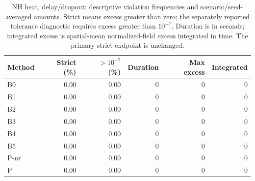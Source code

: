 \begin{table}[ht]
\centering\small
\caption{NH heat, delay/dropout: descriptive violation frequencies and scenario/seed-averaged amounts. Strict means excess greater than zero; the separately reported tolerance diagnostic requires excess greater than $10^{-7}$. Duration is in seconds; integrated excess is spatial-mean normalized-field excess integrated in time. The primary strict endpoint is unchanged.}\label{tab:new_heat_constraints_locked_delay_dropout}
\begin{tabular}{@{}lrrrrr@{}}\toprule
Method & Strict (\%) & $>10^{-7}$ (\%) & Duration & Max excess & Integrated\\\midrule
B0 & 0.00 & 0.00 & 0 & 0 & 0\\
B1 & 0.00 & 0.00 & 0 & 0 & 0\\
B2 & 0.00 & 0.00 & 0 & 0 & 0\\
B3 & 0.00 & 0.00 & 0 & 0 & 0\\
B4 & 0.00 & 0.00 & 0 & 0 & 0\\
B5 & 0.00 & 0.00 & 0 & 0 & 0\\
P-nr & 0.00 & 0.00 & 0 & 0 & 0\\
P & 0.00 & 0.00 & 0 & 0 & 0\\
\bottomrule\end{tabular}
\end{table}
